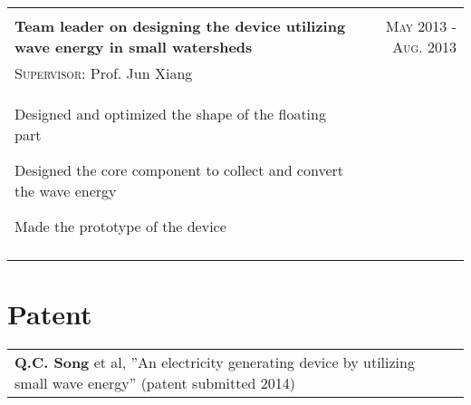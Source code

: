 \documentclass[a4paper,10pt]{article}
\begin{document}
\begin{tabular}{p{14cm}r}
\multicolumn{2}{c}{} \\
 \textbf{Team leader on designing the device utilizing wave energy in small watersheds}  &\textsc{May 2013 - Aug. 2013} \\
\hspace{1em}  \textsc{Supervisor:} Prof. Jun Xiang  & \vspace{-0.5em}\\
\begin{compactitem}
       \item Designed and optimized the shape of the floating part\vspace{0.2em}
       \item Designed the core component to collect and convert the wave energy\vspace{0.2em}
       \item Made the prototype of the device
     \end{compactitem}&\vspace{-1em} \\
\multicolumn{2}{c}{} \vspace{-1.5em} \\


\end{tabular}

\section{Patent}
\begin{tabular}{ll}
\textbf{Q.C. Song} et al, ”An electricity generating device by utilizing small wave energy” (patent submitted 2014) &\\
\end{tabular}
\end{document}
